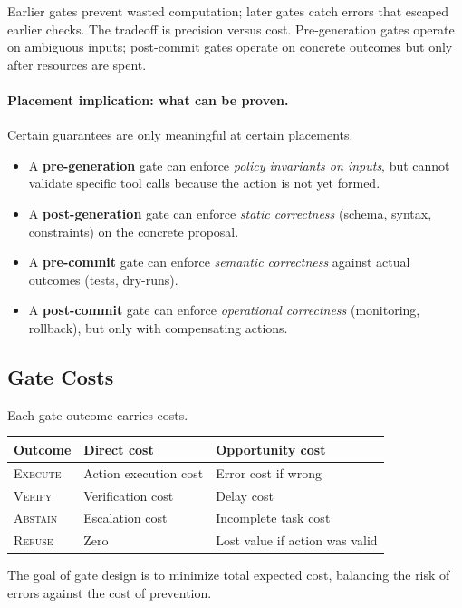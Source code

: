 Earlier gates prevent wasted computation; later gates catch errors that escaped earlier checks. The tradeoff is precision versus cost. Pre-generation gates operate on ambiguous inputs; post-commit gates operate on concrete outcomes but only after resources are spent.

\paragraph{Placement implication: what can be proven.}
Certain guarantees are only meaningful at certain placements.
\begin{itemize}
\item A \textbf{pre-generation} gate can enforce \emph{policy invariants on inputs}, but cannot validate specific tool calls because the action is not yet formed.
\item A \textbf{post-generation} gate can enforce \emph{static correctness} (schema, syntax, constraints) on the concrete proposal.
\item A \textbf{pre-commit} gate can enforce \emph{semantic correctness} against actual outcomes (tests, dry-runs).
\item A \textbf{post-commit} gate can enforce \emph{operational correctness} (monitoring, rollback), but only with compensating actions.
\end{itemize}

\subsection{Gate Costs}

Each gate outcome carries costs.

\begin{center}
\begin{tabular}{lll}
\toprule
Outcome & Direct cost & Opportunity cost \\
\midrule
\textsc{Execute} & Action execution cost & Error cost if wrong \\
\textsc{Verify} & Verification cost & Delay cost \\
\textsc{Abstain} & Escalation cost & Incomplete task cost \\
\textsc{Refuse} & Zero & Lost value if action was valid \\
\bottomrule
\end{tabular}
\end{center}

The goal of gate design is to minimize total expected cost, balancing the risk of errors against the cost of prevention.

